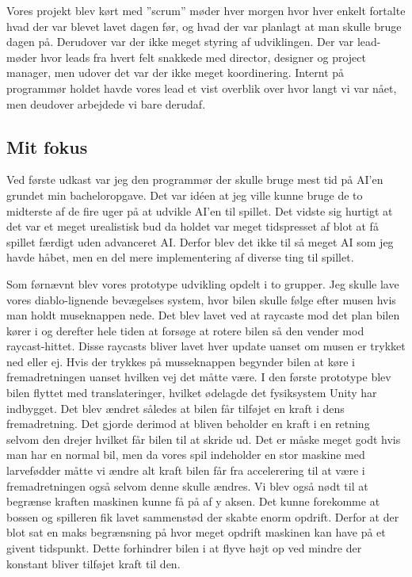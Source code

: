 Vores projekt blev kørt med ''scrum'' møder hver morgen hvor hver enkelt fortalte hvad der var blevet  lavet dagen før, og hvad der var planlagt at man skulle bruge dagen på.
Derudover var der ikke meget styring af udviklingen. Der var lead-møder hvor leads fra hvert felt snakkede med director, designer og project manager, men udover det var der ikke meget koordinering. Internt på programmør holdet havde vores lead et vist overblik over hvor langt vi var nået, men deudover arbejdede vi bare derudaf.




\subsection{Mit fokus}
Ved første udkast var jeg den programmør der skulle bruge mest tid på AI'en grundet min bacheloropgave. Det var idéen at jeg ville kunne bruge de to midterste af de fire uger på at udvikle AI'en til spillet. Det vidste sig hurtigt at det var et meget urealistisk bud da holdet var meget tidspresset af blot at få spillet færdigt uden advanceret AI. Derfor blev det ikke til så meget AI som jeg havde håbet, men en del mere implementering af diverse ting til spillet.

Som førnævnt blev vores prototype udvikling opdelt i to grupper. Jeg skulle lave vores diablo-lignende bevægelses system, hvor bilen skulle følge efter musen hvis man holdt museknappen nede. Det blev lavet ved at raycaste mod det plan bilen kører i og derefter hele tiden at forsøge at rotere bilen så den vender mod raycast-hittet. Disse raycasts bliver lavet hver update uanset om musen er trykket ned eller ej. Hvis der trykkes på musseknappen begynder bilen at køre i fremadretningen uanset hvilken vej det måtte være. I den første prototype blev bilen flyttet med translateringer, hvilket ødelagde det fysiksystem Unity har indbygget. Det blev ændret således at bilen får tilføjet en kraft i dens fremadretning. Det gjorde derimod at bliven beholder en kraft i en retning selvom den drejer hvilket får bilen til at skride ud. Det er måske meget godt hvis man har en normal bil, men da vores spil indeholder en stor maskine med larvefødder måtte vi ændre alt kraft bilen får fra accelerering til at være i fremadretningen også selvom denne skulle ændres. 
Vi blev også nødt til at begrænse kraften maskinen kunne få på af y aksen. Det kunne forekomme at bossen og spilleren fik lavet sammenstød der skabte enorm opdrift. Derfor at der blot sat en maks begrænsning på hvor meget opdrift maskinen kan have på et givent tidspunkt. Dette forhindrer bilen i at flyve højt op ved mindre der konstant bliver tilføjet kraft til den.

